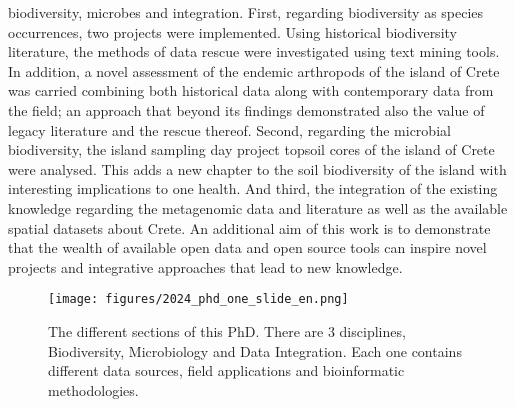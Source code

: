 biodiversity, microbes and integration. 
First, regarding biodiversity as species occurrences, two projects were implemented.
Using historical biodiversity literature, the methods of data rescue were 
investigated using text mining tools.
In addition, a novel assessment of the endemic arthropods of the island of Crete
was carried combining both historical data along with contemporary data from the field;
an approach that beyond its findings demonstrated also the value of legacy
literature and the rescue thereof.
Second, regarding the microbial biodiversity, the island sampling day project 
topsoil cores of the island of Crete were analysed. This adds a new chapter to 
the soil biodiversity of the island with interesting implications to one health.
And third, the integration of the existing knowledge regarding the metagenomic 
data and literature as well as the available spatial datasets about Crete. 
An additional aim of this work is to demonstrate that the wealth of available open data
and open source tools can inspire novel projects and integrative approaches that lead
to new knowledge.

   \begin{figure}[ht]
      \centering
      \texttt{[image: figures/2024\_phd\_one\_slide\_en.png]}
      \caption[Graphical abstract of this PhD]{The different sections of this PhD. There are 3 disciplines, Biodiversity, Microbiology and Data Integration. Each one contains different data sources, field applications and bioinformatic methodologies.}
      \label{fig:phd-one-slide}
   \end{figure}


